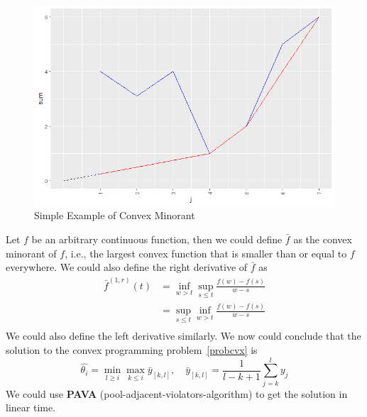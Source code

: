 \documentclass[12pt]{article}
\newcommand{\wh}[1]{\widehat{#1}}
\def\beq{\begin{equation}}
\def\eeq{\end{equation}}
\def\bal{\begin{aligned}}
\def\eal{\end{aligned}}
\def\nbeqal{\[ \bal}
\def\neeqal{\eal \]}
\begin{document}
\begin{figure}[htbp]
  \includegraphics[width=\linewidth]{plt1.png}
  \caption{Simple Example of Convex Minorant}
  \label{fig:boat1}
\end{figure}
Let $f$ be an arbitrary continuous function, then we could define $\bar{f}$ as the convex minorant of $f$, i.e., the largest convex function that is smaller than or equal to $f$ everywhere. We could also define the right derivative of $\bar{f}$ as
\nbeqal
\bar{f}^{(1,r)}(t)&=\inf_{w>t}\sup_{s\leq t}\frac{f(w)-f(s)}{w-s}\\
&=\sup_{s\leq t}\inf_{w>t}\frac{f(w)-f(s)}{w-s}\\
\neeqal
We could also define the left derivative similarly. We now could conclude that the solution to the convex programming problem~\ref{probcvx} is
\beq
\wh{\theta_i}=\min_{l\geq i}\max_{k\leq i}\bar{y}_{[k,l]},\quad \bar{y}_{[k,l]}=\frac{1}{l-k+1}\sum_{j=k}^l y_j
\eeq
We could use \textbf{PAVA} (pool-adjacent-violators-algorithm) to get the solution in linear time.
\end{document}
